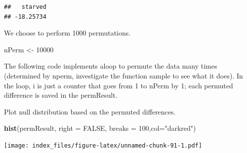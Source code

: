 \documentclass[]{article}
\newenvironment{Shaded}{\begin{snugshade}}{\end{snugshade}}
\newcommand{\CommentTok}[1]{\textcolor[rgb]{0.56,0.35,0.01}{\textit{#1}}}
\newcommand{\ControlFlowTok}[1]{\textcolor[rgb]{0.13,0.29,0.53}{\textbf{#1}}}
\newcommand{\DataTypeTok}[1]{\textcolor[rgb]{0.13,0.29,0.53}{#1}}
\newcommand{\DecValTok}[1]{\textcolor[rgb]{0.00,0.00,0.81}{#1}}
\newcommand{\KeywordTok}[1]{\textcolor[rgb]{0.13,0.29,0.53}{\textbf{#1}}}
\newcommand{\NormalTok}[1]{#1}
\newcommand{\OperatorTok}[1]{\textcolor[rgb]{0.81,0.36,0.00}{\textbf{#1}}}
\newcommand{\OtherTok}[1]{\textcolor[rgb]{0.56,0.35,0.01}{#1}}
\newcommand{\StringTok}[1]{\textcolor[rgb]{0.31,0.60,0.02}{#1}}
\begin{document}
\begin{verbatim}
##   starved 
## -18.25734
\end{verbatim}

We choose to perform 1000 permutations.

\begin{Shaded}
\begin{Highlighting}[]
\NormalTok{nPerm <-}\StringTok{ }\DecValTok{10000}
\end{Highlighting}
\end{Shaded}

The following code implements aloop to permute the data many times
(determined by nperm, investigate the function sample to see what it
does). In the loop, i is just a counter that goes from 1 to nPerm by 1;
each permuted difference is saved in the permResult.

\begin{Shaded}
\end{Shaded}

Plot null distribution based on the permuted differences.

\begin{Shaded}
\begin{Highlighting}[]
\KeywordTok{hist}\NormalTok{(permResult, }\DataTypeTok{right =} \OtherTok{FALSE}\NormalTok{, }\DataTypeTok{breaks =} \DecValTok{100}\NormalTok{,}\DataTypeTok{col=}\StringTok{"darkred"}\NormalTok{)}
\end{Highlighting}
\end{Shaded}

\texttt{[image: index\_files/figure-latex/unnamed-chunk-91-1.pdf]}
\end{document}
